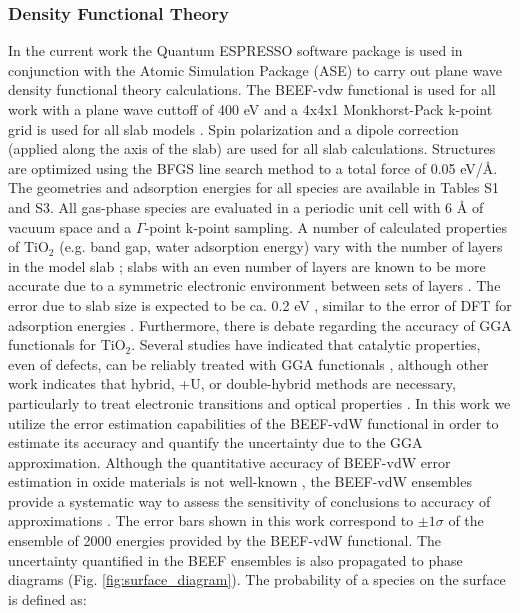\documentclass[journal=ascecg,manuscript=article,articletitle=true]{achemso}
\begin{document}
\subsubsection{Density Functional Theory}
In the current work the Quantum ESPRESSO software package\cite{QE-2009} is used in conjunction with the Atomic Simulation Package (ASE)\cite{ISI:000175131400009} to carry out plane wave density functional theory calculations. The BEEF-vdw functional \cite{Wellendorff_2012} is used for all work with a plane wave cuttoff of 400 eV and a 4x4x1 Monkhorst-Pack k-point grid is used for all slab models \cite{Monkhorst_1976}. Spin polarization and a dipole correction\cite{Bengtsson_1999} (applied along the axis of the slab) are used for all slab calculations. Structures are optimized using the BFGS line search method to a total force of 0.05 eV/\AA{}. The geometries and adsorption energies for all species are available in Tables S1 and S3. All gas-phase species are evaluated in a periodic unit cell with 6 \AA{} of vacuum space and a $\Gamma$-point k-point sampling. A number of calculated properties of TiO$_2$ (e.g. band gap, water adsorption energy) vary with the number of layers in the model slab \cite{Sun2010,Bredow2004,Patel2014}; slabs with an even number of layers are known to be more accurate due to a symmetric electronic environment between sets of layers \cite{Sun2010}. The error due to slab size is expected to be ca. 0.2 eV \cite{Sun2010}, similar to the error of DFT for adsorption energies \cite{Wellendorff_2015}. Furthermore, there is debate regarding the accuracy of GGA functionals for TiO$_2$. Several studies have indicated that catalytic properties, even of defects, can be reliably treated with GGA functionals \cite{Schaub_2001,Li_2008,Zheng_2016}, although other work indicates that hybrid, +U, or double-hybrid methods are necessary, particularly to treat electronic transitions and optical properties  \cite{Morgan_2007,Landmann_2012,De_k_2011, Jauho_2015}. In this work we utilize the error estimation capabilities of the BEEF-vdW functional \cite{Wellendorff_2012} in order to estimate its accuracy and quantify the uncertainty due to the GGA approximation. Although the quantitative accuracy of BEEF-vdW error estimation in oxide materials is not well-known \cite{Walker_2016}, the BEEF-vdW ensembles provide a systematic way to assess the sensitivity of conclusions to accuracy of approximations \cite{Medford_2015a}. The error bars shown in this work correspond to $\pm 1 \sigma$ of the ensemble of 2000 energies provided by the BEEF-vdW functional. The uncertainty quantified in the BEEF ensembles is also propagated to phase diagrams (Fig. \ref{fig:surface_diagram}). The probability of a species on the surface is defined as:
\end{document}
